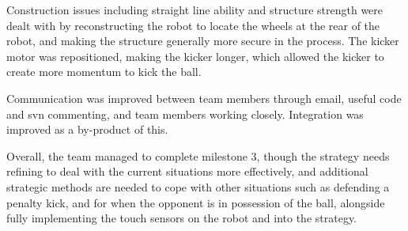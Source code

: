 \documentclass[12pt]{article}
\begin{document}
\begin{flushleft}
Construction issues including straight line ability and structure strength were dealt with by reconstructing the robot to locate the wheels at the rear of the robot, and making the structure generally more secure in the process. The kicker motor was repositioned, making the kicker longer, which allowed the kicker to create more momentum to kick the ball. \linebreak

Communication was improved between team members through email, useful code and svn commenting, and team members working closely. Integration was improved as a by-product of this. \linebreak

Overall, the team managed to complete milestone 3, though the strategy needs refining to deal with the current situations more effectively, and additional strategic methods are needed to cope with other situations such as defending a penalty kick, and for when the opponent is in possession of the ball, alongside fully implementing the touch sensors on the robot and into the strategy.




\end{flushleft}
\end{document}
